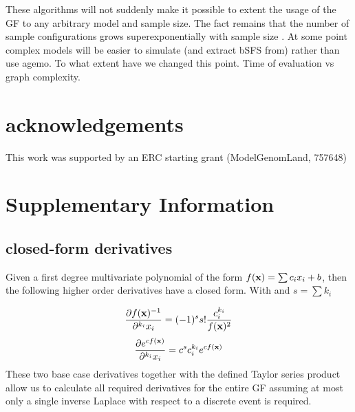 \documentclass[10pt, a4]{article}
\newcommand{\beginsupplement}{%
        \setcounter{table}{0}
        \renewcommand{\thetable}{S\arabic{table}}%
        \setcounter{figure}{0}
        \renewcommand{\thefigure}{S\arabic{figure}}%
     }
\begin{document}

These algorithms will not suddenly make it possible to extent the usage of the GF to any arbitrary model and sample size. The fact remains that the number of sample configurations grows superexponentially with sample size \citep{Lohse2016}. At some point complex models will be easier to simulate (and extract bSFS from) rather than use agemo. To what extent have we changed this point. Time of evaluation vs graph complexity. %

\section*{acknowledgements}
This work was supported by an ERC starting grant (ModelGenomLand, 757648)


\beginsupplement
\newpage
\section*{Supplementary Information}
\setcounter{equation}{0}
\setcounter{figure}{0}
\setcounter{table}{0}
\setcounter{page}{1}
\makeatletter
\renewcommand{\theequation}{S\arabic{equation}}
\renewcommand{\thefigure}{S\arabic{figure}}
\renewcommand{\bibnumfmt}[1]{[S#1]}
\renewcommand{\citenumfont}[1]{S#1}

\subsection*{closed-form derivatives}
Given a first degree multivariate polynomial of the form $f(\bold{x}) = \sum c_ix_i + b$, then the following higher order derivatives have a closed form. With and $s = \sum k_i$

\begin{equation} \label{eq:deriv_polynomial}
\frac{\partial f(\bold{x})^{-1}}{\partial^{k_i} x_i} = (-1)^s s! \frac{c^{k_i}_i}{f(\bold{x})^2}
\end{equation}
%
\begin{equation} \label{eq:deriv_exponential}
\frac{\partial e^{c f(\bold{x})}}{\partial^{k_i} x_i} = c^sc_i^{k_i}e^{cf(\bold{x})}	
\end{equation}
These two base case derivatives together with the defined Taylor series product allow us to calculate all required derivatives for the entire GF assuming at most only a single inverse Laplace with respect to a discrete event is required.
\end{document}
